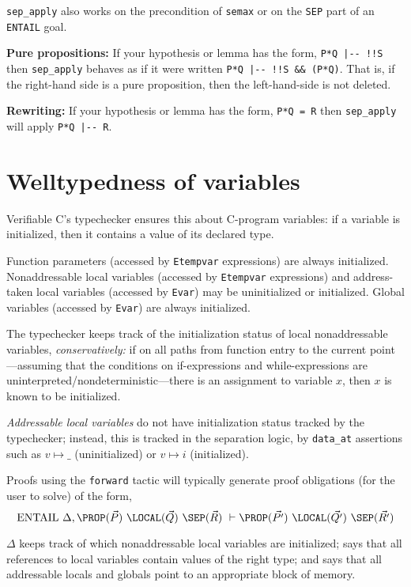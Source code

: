 \documentclass[12pt,fleqn,openany,oneside,showtrims]{memoir}
\newcommand{\ychapter}[2]{\chapter[#1]{#1}}
\begin{document}
\lstinline{sep_apply} also works on the precondition of \lstinline{semax} or on the \lstinline{SEP} part of an \lstinline{ENTAIL} goal.

\textbf{Pure propositions:} If your hypothesis or lemma has the form,
\lstinline{P*Q |-- !!S} then
\lstinline{sep_apply} behaves as if it were written
\lstinline{P*Q |-- !!S && (P*Q)}.
That is, if the right-hand side is a pure proposition,
then the left-hand-side is not deleted.

\textbf{Rewriting:} If your hypothesis or lemma has the form,
\lstinline{P*Q = R} then \lstinline{sep_apply} will apply
\lstinline{P*Q |-- R}.


\ychapter{Welltypedness of variables}{}
\label{refcard:tcval2}

Verifiable C's typechecker ensures this about
C-program variables: if a variable is initialized, then it contains
a value of its declared type.

Function parameters (accessed by
\lstinline{Etempvar} expressions)
are always initialized.
Nonaddressable local variables (accessed by
\lstinline{Etempvar} expressions) and address-taken local variables
(accessed by \lstinline{Evar})
may be uninitialized or initialized.
Global variables (accessed by \lstinline{Evar}) are always
initialized.

The typechecker keeps track of the
initialization status of local nonaddressable
variables, \emph{conservatively:}
if on all paths from function entry to the current
point---assuming that the conditions on if-expressions
and while-expressions are uninterpreted/nondeterministic---there
is an assignment to variable $x$, then $x$ is known to
be initialized.

\emph{Addressable local variables} do not
have initialization status tracked by the typechecker;
instead, this is tracked in the separation logic,
by \lstinline{data_at} assertions such as $v \mapsto \_$
(uninitialized)
or $v \mapsto i$ (initialized).

Proofs using the \lstinline{forward} tactic will typically
generate proof obligations (for the user to solve)
of the form,
\[
\mathrm{ENTAIL}~\Delta,
\PROP(\vec{P})~
\LOCAL(\vec{Q})~
\SEP(\vec{R})
~\vdash
\PROP(\vec{P'})~
\LOCAL(\vec{Q'})~
\SEP(\vec{R'})
\]

$\Delta$
keeps track of which nonaddressable local variables are initialized;
says that all references to local variables
contain values of the right type;
and says that all addressable locals and globals point
to an appropriate block of memory.
\end{document}
